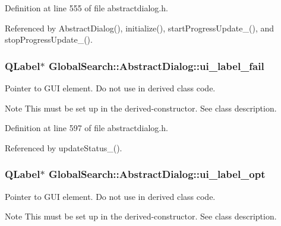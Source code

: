 Definition at line 555 of file abstractdialog.\-h.



Referenced by Abstract\-Dialog(), initialize(), start\-Progress\-Update\-\_\-(), and stop\-Progress\-Update\-\_\-().

\hypertarget{classGlobalSearch_1_1AbstractDialog_a28b127a410ed219e13a0e85c889934e7}{
\subsubsection[{ui\-\_\-label\-\_\-fail}]{\setlength{\rightskip}{0pt plus 5cm}Q\-Label$\ast$ Global\-Search\-::\-Abstract\-Dialog\-::ui\-\_\-label\-\_\-fail\hspace{0.3cm}{\ttfamily [protected]}}}\label{classGlobalSearch_1_1AbstractDialog_a28b127a410ed219e13a0e85c889934e7}
Pointer to G\-U\-I element. Do not use in derived class code. \begin{DoxyNote}{Note}
This must be set up in the derived-\/constructor. See class description. 
\end{DoxyNote}


Definition at line 597 of file abstractdialog.\-h.



Referenced by update\-Status\-\_\-().

\hypertarget{classGlobalSearch_1_1AbstractDialog_af30548b5ed4d5a22a7dc648afae4115b}{
\subsubsection[{ui\-\_\-label\-\_\-opt}]{\setlength{\rightskip}{0pt plus 5cm}Q\-Label$\ast$ Global\-Search\-::\-Abstract\-Dialog\-::ui\-\_\-label\-\_\-opt\hspace{0.3cm}{\ttfamily [protected]}}}\label{classGlobalSearch_1_1AbstractDialog_af30548b5ed4d5a22a7dc648afae4115b}
Pointer to G\-U\-I element. Do not use in derived class code. \begin{DoxyNote}{Note}
This must be set up in the derived-\/constructor. See class description. 
\end{DoxyNote}



